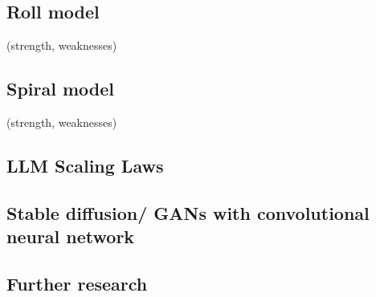\subsection{Roll model}
    (strength, weaknesses)    

\subsection{Spiral model}
    (strength, weaknesses)

\subsection{LLM Scaling Laws}
    
\subsection{Stable diffusion/ GANs with convolutional neural network}
    
\subsection{Further research}